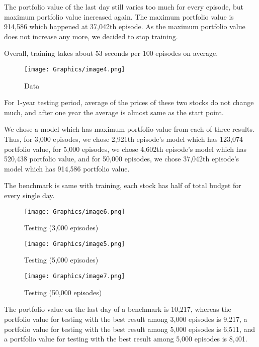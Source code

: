The portfolio value of the last day still varies too much for every episode, but maximum portfolio value increased again. The maximum portfolio value is 914,586 which happened at 37,042th episode. As the maximum portfolio value does not increase any more, we decided to stop training.  

Overall, training takes about 53 seconds per 100 episodes on average.

\begin{figure}[H]
\begin{center}
\texttt{[image: Graphics/image4.png]} \caption{Data}
\end{center}
\end{figure}

For 1-year testing period, average of the prices of these two stocks do not change much, and after one year the average is almost same as the start point. 

We chose a model which has maximum portfolio value from each of three results. Thus, for 3,000 episodes, we chose 2,921th episode's model which has 123,074 portfolio value, for 5,000 episodes, we chose 4,602th episode's model which has 520,438 portfolio value, and for 50,000 episodes, we chose 37,042th episode's model which has 914,586 portfolio value. 

The benchmark is same with training, each stock has half of total budget for every single day.

\begin{figure}[H]
\begin{center}
\texttt{[image: Graphics/image6.png]} \caption{Testing (3,000 episodes)}
\end{center}
\end{figure}

\begin{figure}[H]
\begin{center}
\texttt{[image: Graphics/image5.png]} \caption{Testing (5,000 episodes)}
\end{center}
\end{figure}

\begin{figure}[H]
\begin{center}
\texttt{[image: Graphics/image7.png]} \caption{Testing (50,000 episodes)}
\end{center}
\end{figure}

The portfolio value on the last day of a benchmark is 10,217, whereas the portfolio value for testing with the best result among 3,000 episodes is 9,217, a portfolio value for testing with the best result among 5,000 episodes is 6,511, and a portfolio value for testing with the best result among 5,000 episodes is 8,401. 

